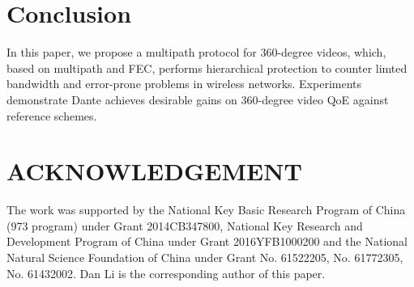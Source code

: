 \documentclass{apnet18}
\begin{document}










\section{Conclusion}
In this paper, we propose a multipath protocol for 360-degree videos, which, based on multipath and FEC, performs hierarchical protection to counter limted bandwidth and error-prone problems in wireless networks. Experiments demonstrate Dante achieves desirable gains on 360-degree video QoE against reference schemes.  

\section*{ACKNOWLEDGEMENT}
The work was supported by the National Key Basic Research Program of China (973 program) under Grant 2014CB347800, National Key Research and Development Program of China under Grant 2016YFB1000200 and the National Natural Science Foundation of China under Grant No. 61522205, No. 61772305, No. 61432002. Dan Li is the corresponding author of this paper.


\begin{small}
	
\end{small}
\label{last-page}
\end{document}
